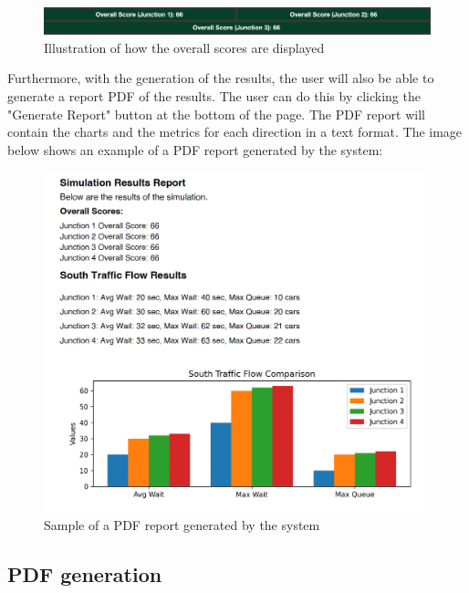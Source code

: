\documentclass{article}
\begin{document}
        \begin{figure}[H]
            \centering
            \includegraphics[width=\textwidth]{overallScores.png}
            \caption{Illustration of how the overall scores are displayed} 
            \label{fig:overallScores}
        \end{figure}

        Furthermore, with the generation of the results, the user will also be able to generate a report PDF of the results. The user can do this by clicking the "Generate Report" button at the bottom of the page. 
        The PDF report will contain the charts and the metrics for each direction in a text format. The image below shows an example of a PDF report generated by the system:

        \begin{figure}[H]
            \centering
            \includegraphics[width=\textwidth]{samplePDF.png}
            \caption{Sample of a PDF report generated by the system} 
            \label{fig:samplePDF}
        \end{figure}

    \subsection{PDF generation}
\end{document}
